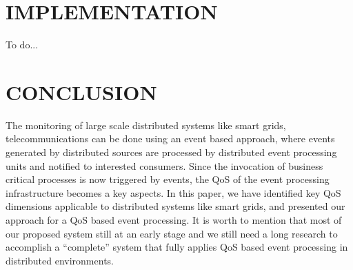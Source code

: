 \documentclass[a4paper,twoside]{article}
\begin{document}
\section{\uppercase{Implementation}}
\label{sec:implem}
To do...


\section{\uppercase{Conclusion}}
\label{sec:conclusion}
The monitoring of large scale distributed systems like smart grids, telecommunications can be done using an event based approach, where events generated by distributed sources are processed by distributed  event processing units and notified to interested consumers. Since the invocation of business critical processes is now triggered by events, the QoS of the event processing infrastructure becomes a key aspects. In this paper, we have identified key QoS dimensions applicable to distributed systems like smart grids, and presented our approach for a QoS based event processing. It is worth to mention that most of our proposed system still at an early stage and we still need a long research to accomplish a “complete” system that fully applies QoS based event processing in distributed environments. 


{\small
}

\vfill
\end{document}
